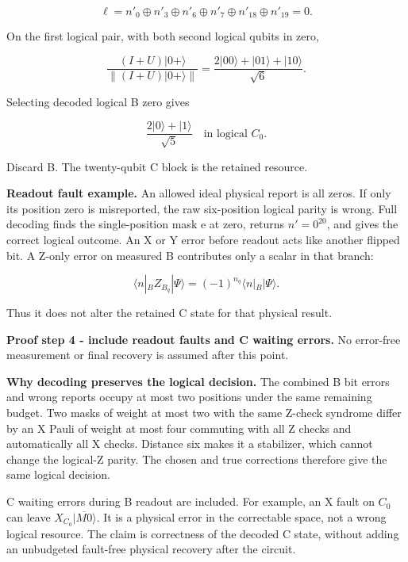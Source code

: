 \documentclass[11pt]{article}
\begin{document}
\[
\ell=n'_0\oplus n'_3\oplus n'_6\oplus n'_7\oplus n'_{18}\oplus n'_{19}=0.
\]

\begin{center}\begin{minipage}{\linewidth}

\end{minipage}\end{center}

On the first logical pair, with both second logical qubits in zero,

\[
\frac{(I+U)|0+\rangle}{\|(I+U)|0+\rangle\|}
=\frac{2|00\rangle+|01\rangle+|10\rangle}{\sqrt6}.
\]

Selecting decoded logical B zero gives

\[
\frac{2|0\rangle+|1\rangle}{\sqrt5}\quad\text{in logical }C_0.
\]

Discard B. The twenty-qubit C block is the retained resource.

\textbf{Readout fault example.} An allowed ideal physical report is all zeros. If only its position zero is misreported, the raw six-position logical parity is wrong. Full decoding finds the single-position mask e at zero, returns \(n'=0^{20}\), and gives the correct logical outcome. An X or Y error before readout acts like another flipped bit. A Z-only error on measured B contributes only a scalar in that branch:

\[
\langle n|_B Z_{B_q}|\Psi\rangle=(-1)^{n_q}\langle n|_B|\Psi\rangle.
\]

Thus it does not alter the retained C state for that physical result.

\textbf{Proof step 4 - include readout faults and C waiting errors.} No error-free measurement or final recovery is assumed after this point.

\textbf{Why decoding preserves the logical decision.} The combined B bit errors and wrong reports occupy at most two positions under the same remaining budget. Two masks of weight at most two with the same Z-check syndrome differ by an X Pauli of weight at most four commuting with all Z checks and automatically all X checks. Distance six makes it a stabilizer, which cannot change the logical-Z parity. The chosen and true corrections therefore give the same logical decision.

C waiting errors during B readout are included. For example, an X fault on \(C_0\) can leave \(X_{C_0}|\overline{M0}\rangle\). It is a physical error in the correctable space, not a wrong logical resource. The claim is correctness of the decoded C state, without adding an unbudgeted fault-free physical recovery after the circuit.
\end{document}
